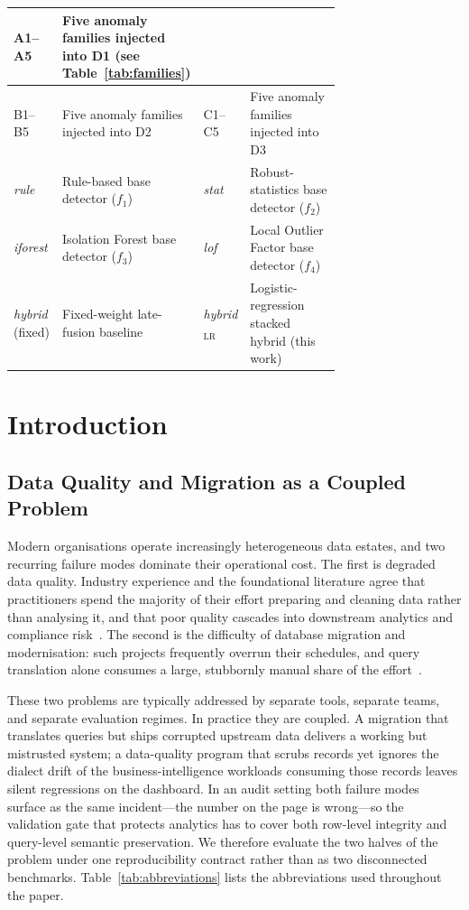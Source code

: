 \documentclass{ieeeaccess}
\begin{document}
\begin{table}[tp]
\begin{tabular}{|l|p{0.36\linewidth}||l|p{0.36\linewidth}|}
A1--A5 & Five anomaly families injected into D1 (see Table~\ref{tab:families}) \\ \hline
B1--B5 & Five anomaly families injected into D2 &
C1--C5 & Five anomaly families injected into D3 \\ \hline
\textit{rule} & Rule-based base detector ($f_1$) &
\textit{stat} & Robust-statistics base detector ($f_2$) \\ \hline
\textit{iforest} & Isolation Forest base detector ($f_3$) &
\textit{lof} & Local Outlier Factor base detector ($f_4$) \\ \hline
\textit{hybrid} (fixed) & Fixed-weight late-fusion baseline &
\textit{hybrid}$_{\text{LR}}$ & Logistic-regression stacked hybrid (this work) \\ \hline
\end{tabular}
\end{table}

\section{Introduction}
\label{sec:introduction}

\subsection{Data Quality and Migration as a Coupled Problem}

Modern organisations operate increasingly heterogeneous data estates, and two
recurring failure modes dominate their operational cost. The first is degraded
data quality. Industry experience and the foundational literature agree that
practitioners spend the majority of their effort preparing and cleaning data
rather than analysing it, and that poor quality cascades into downstream
analytics and compliance risk~\cite{redman1998impact, ehrlinger2022survey}. The
second is the difficulty of database migration and modernisation: such projects
frequently overrun their schedules, and query translation alone consumes a
large, stubbornly manual share of the
effort~\cite{stonebraker2018data, ilyas2019data}.

These two problems are typically addressed by separate tools, separate teams,
and separate evaluation regimes. In practice they are coupled. A migration that
translates queries but ships corrupted upstream data delivers a working but
mistrusted system; a data-quality program that scrubs records yet ignores the
dialect drift of the business-intelligence workloads consuming those records
leaves silent regressions on the dashboard. In an audit setting both failure
modes surface as the same incident---the number on the page is wrong---so the
validation gate that protects analytics has to cover both row-level integrity
and query-level semantic preservation. We therefore evaluate the two halves of
the problem under one reproducibility contract rather than as two disconnected
benchmarks. Table~\ref{tab:abbreviations} lists the abbreviations used
throughout the paper.
\end{document}
